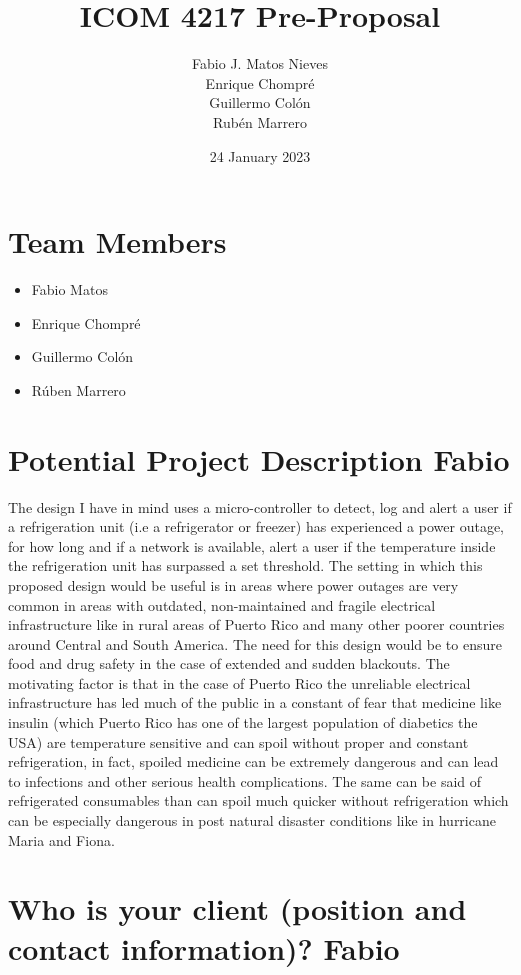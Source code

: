 \documentclass[12pt]{article}
\title{ICOM 4217 Pre-Proposal}
\author{Fabio J. Matos Nieves\\
  Enrique Chompré\\
  Guillermo Colón\\
Rubén Marrero}
\date{24 January 2023}
\begin{document}
\maketitle
\newpage
\thispagestyle{empty}
\pagestyle{plain}
\section{Team Members}
\begin{itemize}
  \item Fabio Matos
  \item Enrique Chompré
  \item Guillermo Colón
  \item Rúben Marrero
\end{itemize} 
\newpage
\section{Potential Project Description Fabio}
The design I have in mind uses a micro-controller to detect, log and alert a user if a refrigeration unit (i.e a refrigerator or freezer) has experienced a power outage, for how long and if a network is available, alert a user if the temperature inside the refrigeration unit has surpassed a set threshold. The setting in which this proposed design would be useful is in areas where power outages are very common in areas with outdated, non-maintained and fragile electrical infrastructure like in rural areas of Puerto Rico and many other poorer countries around Central and South America. The need for this design would be to ensure food and drug safety in the case of extended and sudden blackouts. The motivating factor is that in the case of Puerto Rico the unreliable electrical infrastructure has led much of the public in a constant of fear that medicine like insulin (which Puerto Rico has one of the largest population of diabetics the USA) are temperature sensitive and can spoil without proper and constant refrigeration, in fact, spoiled medicine can be extremely dangerous and can lead to infections and other serious health complications. The same can be said of refrigerated consumables than can spoil much quicker without refrigeration which can be especially dangerous in post natural disaster conditions like in hurricane Maria and Fiona.
\newpage
\section{Who is your client (position and contact information)? Fabio}
\end{document}
